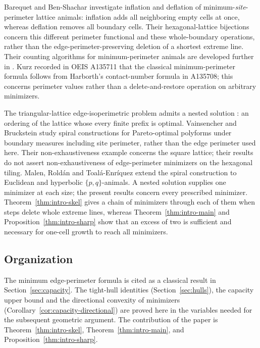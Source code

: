 \documentclass[11pt]{article}
\theoremstyle{plain}
\theoremstyle{definition}
\theoremstyle{remark}
\begin{document}
Barequet and Ben-Shachar \cite{BarequetBenShachar2022} investigate inflation and
deflation of minimum-\emph{site}-perimeter lattice animals: inflation adds all
neighboring empty cells at once, whereas deflation removes all boundary cells.
Their hexagonal-lattice bijections concern this different perimeter functional
and these whole-boundary operations, rather than the edge-perimeter-preserving
deletion of a shortest extreme line. Their counting algorithms for minimum-perimeter
animals are developed further in \cite{BarequetBenShachar2023}.
Kurz \cite{OEIS_A135711_Kurz} recorded in OEIS A135711 that the classical
minimum-perimeter formula follows from Harborth's contact-number formula in
A135708; this concerns perimeter values rather than a delete-and-restore
operation on arbitrary minimizers.

The triangular-lattice edge-isoperimetric problem admits a nested solution
\cite[Theorem~7.2, p.~135]{Harper2004}: an ordering of the lattice whose every finite
prefix is optimal. Vainsencher and Bruckstein \cite{VainsencherBruckstein2008}
study spiral constructions for Pareto-optimal polyforms under boundary measures
including site perimeter, rather than the edge perimeter used here. Their
non-exhaustiveness example concerns the square lattice; their results do not
assert non-exhaustiveness of edge-perimeter minimizers on the hexagonal tiling. Malen, Rold\'an and Toal\'a-Enr\'iquez
\cite{MalenRoldanToala2023} extend the spiral construction to Euclidean and
hyperbolic $\{p,q\}$-animals. A nested solution supplies one minimizer at each
size; the present results concern every prescribed minimizer.
Theorem~\ref{thm:intro-skel} gives a chain of minimizers through each of them when
steps delete whole extreme lines, whereas Theorem~\ref{thm:intro-main}
and Proposition~\ref{thm:intro-sharp} show that an excess of two is sufficient and necessary
for one-cell growth to reach all minimizers.

\subsection{Organization}\label{sec:0.6}

The minimum edge-perimeter formula is cited as a classical result in
Section~\ref{sec:capacity}. The tight-hull identities (Section~\ref{sec:hulls}),
the capacity upper bound and the directional convexity of minimizers
(Corollary~\ref{cor:capacity-directional}) are proved here in the variables needed
for the subsequent geometric argument. The contribution of the
paper is Theorem~\ref{thm:intro-skel}, Theorem~\ref{thm:intro-main}, and Proposition~\ref{thm:intro-sharp}.
\end{document}
